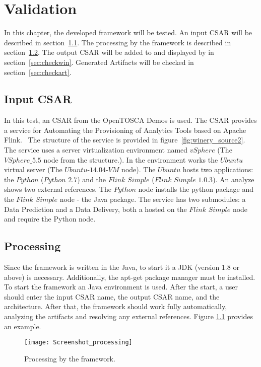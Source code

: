
\chapter{Validation}\label{chap:check}
In this chapter, the developed framework will be tested.
An input CSAR will be described in section~\ref{sec:inputcsar}.
The processing by the framework is described in section~\ref{sec:process}.
The output CSAR will be added to and displayed by  in section~\ref{sec:checkwin}.
Generated Artifacts will be checked in section~\ref{sec:checkart}.

\section{Input CSAR}\label{sec:inputcsar}
In this test, an CSAR from the OpenTOSCA Demos is used. 
The CSAR provides a service for Automating the Provisioning of Analytics Tools based on Apache Flink.~\cite{csar_test}
The structure of the service is provided in figure~\ref{fig:winery_source2}. 
The service uses a server virtualization environment named $vSphere$ (The $VSphere\_5.5$ node from the structure.). 
In the environment works the $Ubuntu$ virtual server (The $Ubuntu$-$14.04$-$VM$ node).
The $Ubuntu$ hosts two applications: the $Python$ ($Python\_2.7$) and the $Flink$ $Simple$ ($Flink\_Simple\_1.0.3$).
An analyze shows two external references. The $Python$ node installs the python package and the $Flink$ $Simple$ node - the Java package.
The service has two submodules: a Data Prediction and a Data Delivery, both a hosted on the $Flink$ $Simple$ node and require the Python node. 

\section{Processing}\label{sec:process}
Since the framework is written in the Java, to start it a JDK (version 1.8 or above) is necessary.
Additionally, the apt-get package manager must be installed. 
To start the framework an Java environment is used.
After the start, a user should enter the input CSAR name, the output CSAR name, and the architecture.
After that, the framework should work fully automatically, analyzing the artifacts and resolving any external references.
Figure \ref{fig:process} provides an example.
\begin{figure}[ht]   
	\centering
	\texttt{[image: Screenshot\_processing]}
	\caption{Processing by the framework.}
	\label{fig:process}
\end{figure}

